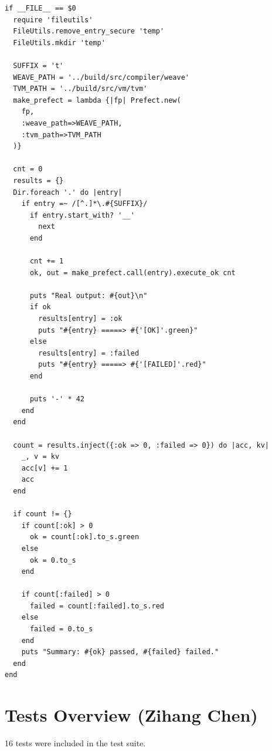 \documentclass{report}
\begin{document}
\begin{mdframed}[style=cl]
\begin{verbatim}
if __FILE__ == $0
  require 'fileutils'
  FileUtils.remove_entry_secure 'temp'
  FileUtils.mkdir 'temp'

  SUFFIX = 't'
  WEAVE_PATH = '../build/src/compiler/weave'
  TVM_PATH = '../build/src/vm/tvm'
  make_prefect = lambda {|fp| Prefect.new(
    fp,
    :weave_path=>WEAVE_PATH,
    :tvm_path=>TVM_PATH
  )}

  cnt = 0
  results = {}
  Dir.foreach '.' do |entry|
    if entry =~ /[^.]*\.#{SUFFIX}/
      if entry.start_with? '__'
        next
      end

      cnt += 1
      ok, out = make_prefect.call(entry).execute_ok cnt

      puts "Real output: #{out}\n"
      if ok
        results[entry] = :ok
        puts "#{entry} =====> #{'[OK]'.green}"
      else
        results[entry] = :failed
        puts "#{entry} =====> #{'[FAILED]'.red}"
      end

      puts '-' * 42
    end
  end

  count = results.inject({:ok => 0, :failed => 0}) do |acc, kv|
    _, v = kv
    acc[v] += 1
    acc
  end

  if count != {}
    if count[:ok] > 0
      ok = count[:ok].to_s.green
    else
      ok = 0.to_s
    end

    if count[:failed] > 0
      failed = count[:failed].to_s.red
    else
      failed = 0.to_s
    end
    puts "Summary: #{ok} passed, #{failed} failed."
  end
end
  \end{verbatim}
\end{mdframed}

\section{Tests Overview (Zihang Chen)}

16 tests were included in the test suite.
\end{document}
